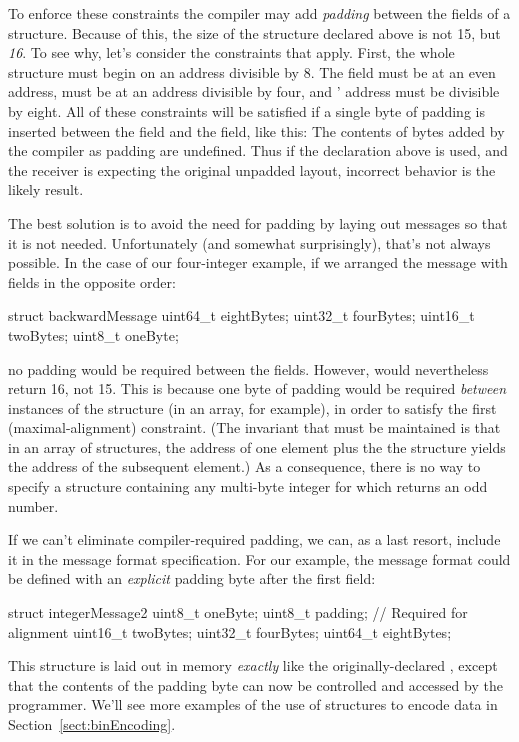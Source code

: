 To enforce these constraints the compiler may add \emph{padding\/}
between the fields of a structure.  Because of this, the size of the
structure declared above is not 15, but \emph{16}.  To see why, let's
consider the constraints that apply.  First,
the whole structure must begin on an address divisible by 8.  The
 field must be at an even address,  must
be at an address divisible by four, and ' address must be
divisible by eight.  All of these constraints will be satisfied if a
single byte of padding is inserted between the  field and
the  field, like this:
%
%
The contents of bytes added by the compiler as padding are undefined.
Thus if the declaration above is used, and the receiver
is expecting the original unpadded layout, incorrect behavior is the
likely result.

The best solution is to avoid the need for padding by laying out
messages so that it is not needed.
Unfortunately (and somewhat surprisingly), that's not always possible.
In the case of our four-integer example, if we arranged the message
with fields in the opposite order:
\begin{inlinecode}
  struct backwardMessage {
    uint64_t eightBytes;
    uint32_t fourBytes;
    uint16_t twoBytes;
    uint8_t oneByte;
  } 
\end{inlinecode}
no padding would be required between the fields.
However, 
would nevertheless return 16, not 15.
This is because one byte of padding would be required
\emph{between\/} instances of the
structure (in an array, for example), in order to satisfy the
first (maximal-alignment) constraint.
(The invariant that must be maintained is that in an array of
structures, the address of one element plus the  the
structure yields the address of the subsequent element.)
%
As a consequence, there is no way to specify
a structure containing any multi-byte integer for which 
returns an odd number.

If we can't eliminate compiler-required padding, we can, as a last
resort, include it in the message format specification.
For our example, the message format could be
defined with an \emph{explicit} padding byte after the first field:
\begin{inlinecode}
  struct integerMessage2 {
    uint8_t oneByte;
    uint8_t padding;   // Required for alignment
    uint16_t twoBytes;
    uint32_t fourBytes;
    uint64_t eightBytes;
  } 
\end{inlinecode}
This structure is laid out in memory \emph{exactly\/}
like the originally-declared , except that
the contents of the padding byte can now be controlled and accessed by
the programmer. 
%
We'll see more examples of the use of structures to encode data in
Section~\ref{sect:binEncoding}.

